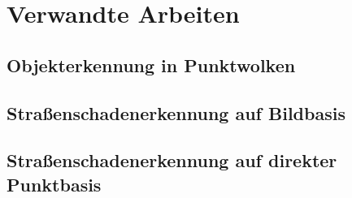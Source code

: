 
\chapter{Verwandte Arbeiten}

\section{Objekterkennung in Punktwolken}

\section{Straßenschadenerkennung auf Bildbasis}

\section{Straßenschadenerkennung auf direkter Punktbasis} %